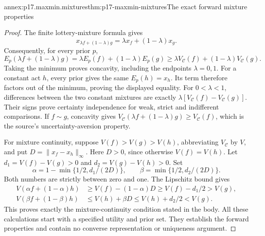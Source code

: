 \begin{annexitem}{annex:p17.maxmin.mixtures}{thm:p17-maxmin-mixtures}{The exact forward mixture properties}
\begin{proof}
The finite lottery-mixture formula gives
\[
 x_{\lambda f+(1-\lambda)g}
                       =\lambda x_f+(1-\lambda)x_g.
\]
Consequently, for every prior \(p\),
\[
 E_p(\lambda f+(1-\lambda)g)
   =\lambda E_p(f)+(1-\lambda)E_p(g)
   \geq\lambda V_{\mathcal C}(f)+(1-\lambda)V_{\mathcal C}(g).
\]
Taking the minimum proves concavity, including
the endpoints \(\lambda=0,1\).
For a constant act \(h\), every prior gives
the same \(E_p(h)=x_h\). Its term therefore
factors out of the minimum, proving the
displayed equality.
For \(0<\lambda<1\), differences between
the two constant mixtures are exactly
\(\lambda[V_{\mathcal C}(f)-V_{\mathcal C}(g)]\).
Their signs prove certainty independence
for weak, strict and indifferent comparisons.
If \(f\sim g\), concavity gives
\(V_{\mathcal C}(\lambda f+(1-\lambda)g)
\geq V_{\mathcal C}(f)\), which is the
source's uncertainty-aversion property.

For mixture continuity, suppose
\(V(f)>V(g)>V(h)\), abbreviating \(V_{\mathcal C}\)
by \(V\), and put \(D=\|x_f-x_h\|_\infty\).
Here \(D>0\), since otherwise \(V(f)=V(h)\).
Let \(d_1=V(f)-V(g)>0\) and
\(d_2=V(g)-V(h)>0\). Set
\[
 \alpha=1-\min\{1/2,d_1/(2D)\},\qquad
 \beta=\min\{1/2,d_2/(2D)\}.
\]
Both numbers are strictly between zero and
one. The Lipschitz bound gives
\[
\begin{aligned}
 V(\alpha f+(1-\alpha)h)&\geq V(f)-(1-\alpha)D
                                         \geq V(f)-d_1/2>V(g),\\
 V(\beta f+(1-\beta)h)&\leq V(h)+\beta D
                                         \leq V(h)+d_2/2<V(g).
\end{aligned}
\]
This proves exactly the mixture-continuity
condition stated in the body.
All these calculations start with a specified
utility and prior set. They establish the
forward properties and contain no converse
representation or uniqueness argument.
\end{proof}
\end{annexitem}

